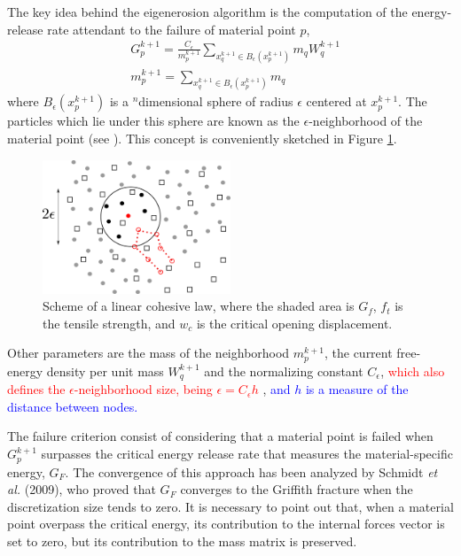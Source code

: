 \documentclass[preprint,12pt,a4paper]{elsarticle}
\newcommand{\PNA}[1]{
  \textcolor{red}{{#1}}
}
\newcommand{\MMP}[1]{
  \textcolor{blue}{{#1}}
}
\begin{document}
The key idea behind the eigenerosion algorithm is the computation of the
energy-release rate attendant to the failure of material point $p$,
\begin{align}
  \label{eq:energy-release-EE}
&G_p^{k+1} = \frac{C_{\epsilon}}{m_p^{k+1}}  \sum_{x_q^{k+1} \in
  B_{\epsilon}(x_p^{k+1})} m_q W_q^{k+1}\\
  \label{eq:mass-EE}
&m_p^{k+1} =  \sum_{x_q^{k+1} \in
  B_{\epsilon}(x_p^{k+1})} m_q  
\end{align}
where $B_{\epsilon}(x_p^{k+1})$ is a $^n$dimensional sphere of radius $\epsilon$
centered at $x_p^{k+1}$. The particles which lie under this sphere are
known as the $\epsilon$-neighborhood of the material point (see
\cite{Pandolfi_2012}). This concept is conveniently sketched in
Figure \ref{fig:Failed-particles}.
\begin{figure}
  \centering
  \includegraphics[width=0.5\textwidth]{Figure-Particle-failed}
  \caption{Scheme of a linear cohesive law, where the shaded area is
    $G_f$, $f_t$ is the tensile strength, and $w_c$ is the critical
    opening displacement.}
  \label{fig:Failed-particles}
\end{figure}
Other parameters are the mass of the neighborhood $m_p^{k+1}$, the
current free-energy density per unit mass  $W_q^{k+1}$ and the
normalizing constant $C_{\epsilon}$, \PNA{which also defines the
  $\epsilon$-neighborhood size, being $\epsilon = C_\epsilon h$}, \MMP{ and
  $h$ is a measure of the distance between nodes.}

The failure criterion consist of considering that a material point is failed
when $G_p^{k+1}$ surpasses the critical energy release rate that
measures the material-specific energy, $G_F$. The convergence of this
approach has been analyzed by Schmidt {\it et al.}
(2009)\cite{Schmidt_2009}, who proved that $G_F$ converges to the Griffith
fracture when the discretization size tends to zero. It is necessary to
point out that, when a material point overpass the critical energy, its
contribution to the internal forces vector is set to zero, but its
contribution to the mass matrix is preserved.\\
\end{document}
